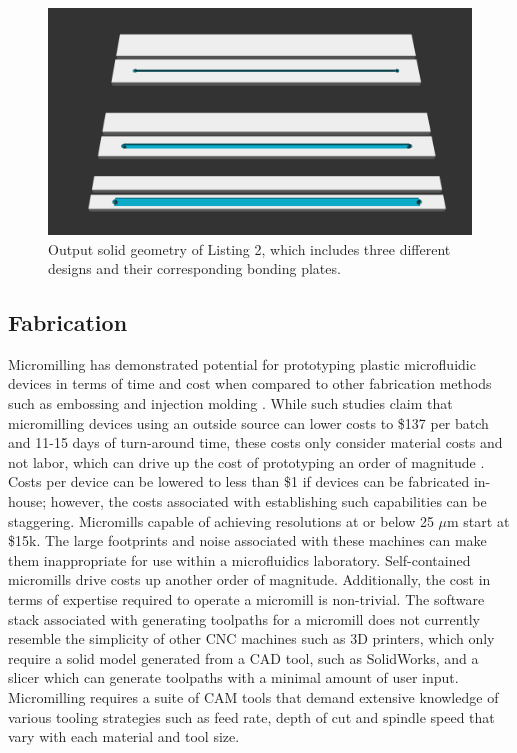 \begin{figure}[htb]
  \begin{minipage}[t]{0.99\linewidth}\centering
    \includegraphics[width=14cm]{ExampleLayout}
  \end{minipage}\hfill
  \caption[Example layout of multiple device designs]{Output solid geometry of Listing 2, which includes three different designs and their corresponding bonding plates.}
	\label{fig:layout}
\end{figure}


\subsection{Fabrication}
\label{ssec:fab}

Micromilling has demonstrated potential for prototyping plastic microfluidic devices in terms of time and cost when compared to other fabrication methods such as embossing and injection molding \cite{guckenberger2015micromilling}. While such studies claim that micromilling devices using an outside source can lower costs to \$137 per batch and 11-15 days of turn-around time, these costs only consider material costs and not labor, which can drive up the cost of prototyping an order of magnitude \cite{guckenberger2015micromilling}. Costs per device can be lowered to less than \$1 if devices can be fabricated in-house; however, the costs associated with establishing such capabilities can be staggering. Micromills capable of achieving resolutions at or below 25 $\mu$m start at \$15k. The large footprints and noise associated with these machines can make them inappropriate for use within a microfluidics laboratory. Self-contained micromills drive costs up another order of magnitude. Additionally, the cost in terms of expertise required to operate a micromill is non-trivial. The software stack associated with generating toolpaths for a micromill does not currently resemble the simplicity of other CNC machines such as 3D printers, which only require a solid model generated from a CAD tool, such as SolidWorks, and a slicer which can generate toolpaths with a minimal amount of user input. Micromilling requires a suite of CAM tools that demand extensive knowledge of various tooling strategies such as feed rate, depth of cut and spindle speed that vary with each material and tool size. 

